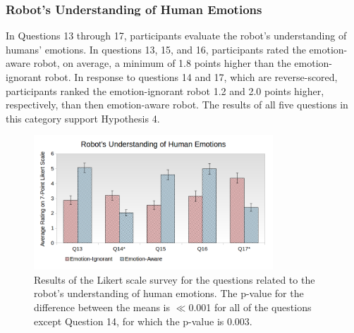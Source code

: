 \documentclass[12pt]{report}
\begin{document}
\subsubsection{Robot's Understanding of Human Emotions} 
\label{sec:Emotions}
In Questions 13 through 17, participants evaluate the robot's understanding of
humans' emotions. In questions 13, 15, and 16, participants rated the
emotion-aware robot, on average, a minimum of 1.8 points higher than the
emotion-ignorant robot. In response to questions 14 and 17, which are
reverse-scored, participants ranked the emotion-ignorant robot 1.2 and 2.0
points higher, respectively, than then emotion-aware robot. The results
of all five questions in this category support Hypothesis 4.

\vspace*{-5mm}
\begin{figure}[tbh]
\centering
\includegraphics[width=0.8\textwidth]{figure/Overall-Emotions.png}
\vspace*{-5mm}
\caption{\fontsize{10}{10}\selectfont Results of the Likert scale survey for the
questions related to the robot's understanding of human emotions. The p-value
for the difference between the means is $\ll$0.001 for all of the questions
except Question 14, for which the p-value is 0.003.}
\label{fig:overall-emotions}
\vspace*{-5mm}
\end{figure}
\end{document}
